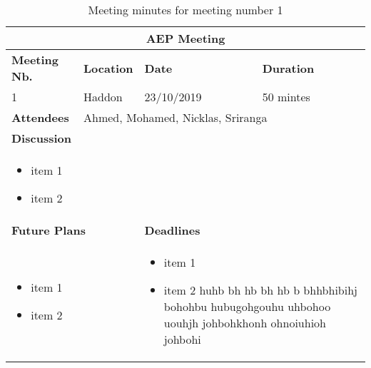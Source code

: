 \renewcommand\mTitle{\textbf{AEP Meeting}}
\renewcommand\mNumber{1}
\renewcommand\mLocation{Haddon}
\renewcommand\mDate{23/10/2019}
\renewcommand\mDuration{50 mintes}
\renewcommand\mAttendies{Ahmed, Mohamed, Nicklas, Sriranga}
\renewcommand\mMinuteTaker{Mohamed}
\renewcommand\mDiscussion{
    \begin{minipage}[t]{0.955\textwidth}
    \begin{itemize}
    \item item 1
    \item item 2
    \end{itemize} \vspace{1mm}
    \end{minipage}}
\renewcommand\mFuturePlans{
    \begin{minipage}[t]{0.45\textwidth}
    \begin{itemize}
    \item item 1
    \item item 2
    \end{itemize}  \vspace{1mm}
    \end{minipage}}
\renewcommand\mDeadlines{
    \begin{minipage}[t]{0.45\textwidth}
    \begin{itemize}
    \item item 1
    \item item 2 huhb bh hb bh hb b bhhbhibihj bohohbu hubugohgouhu uhbohoo uouhjh johbohkhonh ohnoiuhioh johbohi 
    \end{itemize}  \vspace{1mm}
  \end{minipage}}

\begin{table}[h]
    \centering
\begin{tabularx}{\textwidth}{l|l|l|l}
\hline
\multicolumn{4}{c}{\mTitle}  \\ 
\hline
    \textbf{Meeting Nb.} & \textbf{Location} & \textbf{Date} & \textbf{Duration} \\
    \mNumber  & \mLocation & \mDate & \mDuration \\ 
    \hline
    \textbf{Attendees} & \multicolumn{3}{l}{\mAttendies}\\ 
    \hline
    \multicolumn{4}{l}{\textbf{Discussion}} \\  [1ex]
    \multicolumn{4}{l}{\mDiscussion} \\ \hline
    \multicolumn{2}{l}{\textbf{Future Plans}} \vline & \multicolumn{2}{l}{\textbf{Deadlines}}\\  [1ex]
    \multicolumn{2}{l}{\mFuturePlans} \vline &
    \multicolumn{2}{l}{\mDeadlines} \\\hline
\end{tabularx}
\caption{Meeting minutes for meeting number \mNumber}
\end{table}